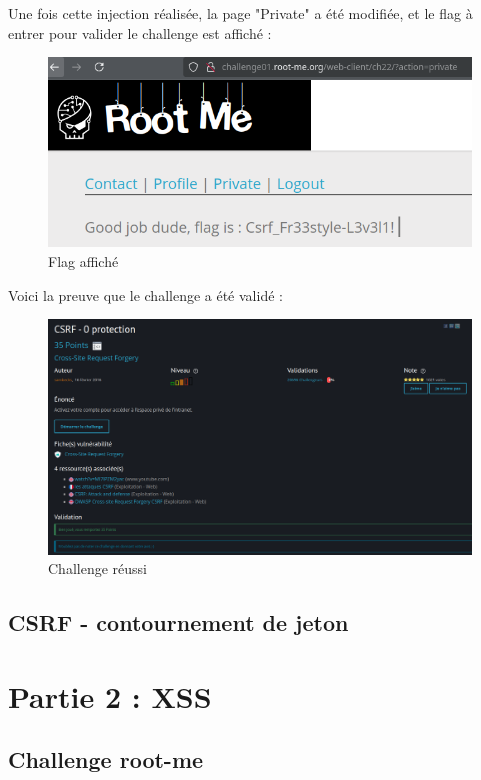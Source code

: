 \documentclass[12pt,a4paper]{article}
\begin{document}
Une fois cette injection réalisée, la page "Private" a été modifiée, et le flag à entrer pour valider le challenge est affiché : 

\begin{figure}[!h]
	\centering
	\includegraphics[scale=.45]{private_after.png}
	\caption{Flag affiché}
\end{figure}

Voici la preuve que le challenge a été validé : 

\begin{figure}[!h]
	\centering
	\includegraphics[scale=.45]{reussi_rootme.png}
	\caption{Challenge réussi}
\end{figure}

\newpage
	
	\subsection{CSRF - contournement de jeton}

\section{Partie 2 : XSS}

	\subsection{Challenge root-me}
	
\end{document}
